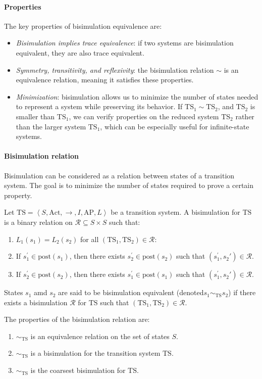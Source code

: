 \paragraph*{Properties}
The key properties of bisimulation equivalence are: 
\begin{itemize}
    \item \textit{Bisimulation implies trace equivalence}: if two systems are bisimulation equivalent, they are also trace equivalent.
    \item \textit{Symmetry, transitivity, and reflexivity}: the bisimulation relation $\sim$ is an equivalence relation, meaning it satisfies these properties.
    \item \textit{Minimization}: bisimulation allows us to minimize the number of states needed to represent a system while preserving its behavior. 
        If $\text{TS}_1\sim\text{TS}_2$, and $\text{TS}_2$ is smaller than $\text{TS}_1$, we can verify properties on the reduced system $\text{TS}_2$ rather than the larger system $\text{TS}_1$, which can be especially useful for infinite-state systems.
\end{itemize}

\paragraph*{Bisimulation relation}
Bisimulation can be considered as a relation between states of a transition system. 
The goal is to minimize the number of states required to prove a certain property.
\begin{definition}
    Let $\text{TS}=\left\langle S,\text{Act},\rightarrow,I,\text{AP},L\right\rangle$ be a transition system. 
    A bisimulation for $\text{TS}$ is a binary relation on $\mathcal{R}\subseteq S\times S$ such that:
    \begin{enumerate}
        \item $L_1(s_1)=L_2(s_2)$ for all $(\text{TS}_1,\text{TS}_2)\in\mathcal{R}$: 
        \item If $s_1^\prime\in\text{post}(s_1)$, then there exists $s_2^\prime\in\text{post}(s_2)$ such that $(s_1^\prime,s_2\prime)\in\mathcal{R}$. 
        \item If $s_2^\prime\in\text{post}(s_2)$, then there exists $s_1^\prime\in\text{post}(s_1)$ such that $(s_1^\prime,s_2\prime)\in\mathcal{R}$. 
    \end{enumerate}
    States $s_1$ amd $s_2$ are said to be bisimulation equivalent (denoted$s_1\sim_{\text{TS}}s_2$) if there exists a bisimulation $\mathcal{R}$ for $\text{TS}$ such that $(\text{TS}_1,\text{TS}_2)\in\mathcal{R}$. 
\end{definition}
\noindent The properties of the bisimulation relation are: 
\begin{enumerate}
    \item $\sim_{\text{TS}}$ is an equivalence relation on the set of states $S$.
    \item $\sim_{\text{TS}}$ is a bisimulation for the transition system $\text{TS}$. 
    \item $\sim_{\text{TS}}$ is the coarsest bisimulation for $\text{TS}$. 
\end{enumerate}

